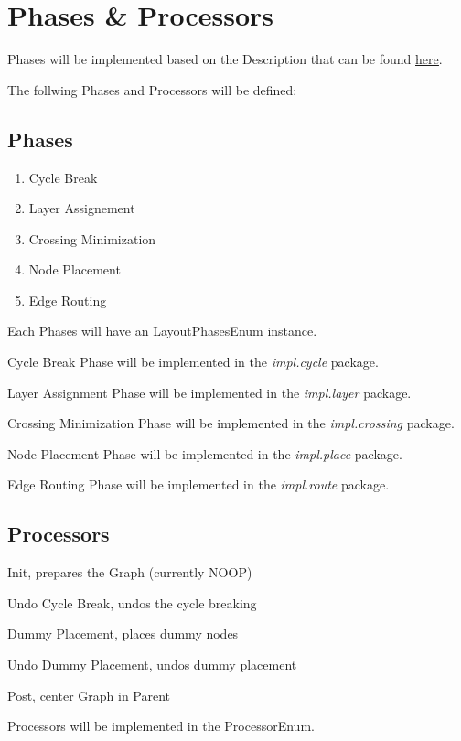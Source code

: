 \section{Phases \& Processors}

Phases will be implemented based on the Description that can be found \underline{
\href{https://www.eclipse.org/elk/documentation/algorithmdevelopers/algorithmimplementation/algorithmstructure.html}{here}}.

The follwing Phases and Processors will be defined:

\subsection{Phases}
\begin{enumerate}
\item Cycle Break
\item Layer Assignement
\item Crossing Minimization
\item Node Placement
\item Edge Routing
\end{enumerate}

Each Phases will have an LayoutPhasesEnum instance.

Cycle Break Phase will be implemented in the \textit{impl.cycle} package.

Layer Assignment Phase will be implemented in the \textit{impl.layer} package.

Crossing Minimization Phase will be implemented in the \textit{impl.crossing} package.

Node Placement Phase will be implemented in the \textit{impl.place} package.

Edge Routing Phase will be implemented in the \textit{impl.route} package.

\subsection{Processors}
\begin{list}{-}{}
\item Init, prepares the Graph (currently NOOP)
\item Undo Cycle Break, undos the cycle breaking
\item Dummy Placement, places dummy nodes
\item Undo Dummy Placement, undos dummy placement
\item Post, center Graph in Parent
\end{list}


Processors will be implemented in the ProcessorEnum.



